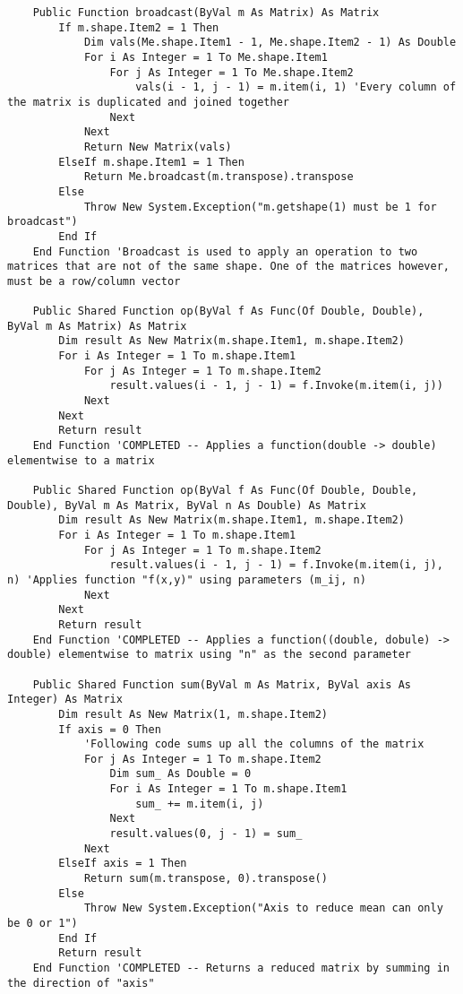\begin{verbatim}
    Public Function broadcast(ByVal m As Matrix) As Matrix
        If m.shape.Item2 = 1 Then
            Dim vals(Me.shape.Item1 - 1, Me.shape.Item2 - 1) As Double
            For i As Integer = 1 To Me.shape.Item1
                For j As Integer = 1 To Me.shape.Item2
                    vals(i - 1, j - 1) = m.item(i, 1) 'Every column of the matrix is duplicated and joined together
                Next
            Next
            Return New Matrix(vals)
        ElseIf m.shape.Item1 = 1 Then
            Return Me.broadcast(m.transpose).transpose
        Else
            Throw New System.Exception("m.getshape(1) must be 1 for broadcast")
        End If
    End Function 'Broadcast is used to apply an operation to two matrices that are not of the same shape. One of the matrices however, must be a row/column vector

    Public Shared Function op(ByVal f As Func(Of Double, Double), ByVal m As Matrix) As Matrix
        Dim result As New Matrix(m.shape.Item1, m.shape.Item2)
        For i As Integer = 1 To m.shape.Item1
            For j As Integer = 1 To m.shape.Item2
                result.values(i - 1, j - 1) = f.Invoke(m.item(i, j))
            Next
        Next
        Return result
    End Function 'COMPLETED -- Applies a function(double -> double) elementwise to a matrix

    Public Shared Function op(ByVal f As Func(Of Double, Double, Double), ByVal m As Matrix, ByVal n As Double) As Matrix
        Dim result As New Matrix(m.shape.Item1, m.shape.Item2)
        For i As Integer = 1 To m.shape.Item1
            For j As Integer = 1 To m.shape.Item2
                result.values(i - 1, j - 1) = f.Invoke(m.item(i, j), n) 'Applies function "f(x,y)" using parameters (m_ij, n) 
            Next
        Next
        Return result
    End Function 'COMPLETED -- Applies a function((double, dobule) -> double) elementwise to matrix using "n" as the second parameter

    Public Shared Function sum(ByVal m As Matrix, ByVal axis As Integer) As Matrix
        Dim result As New Matrix(1, m.shape.Item2)
        If axis = 0 Then
            'Following code sums up all the columns of the matrix
            For j As Integer = 1 To m.shape.Item2
                Dim sum_ As Double = 0
                For i As Integer = 1 To m.shape.Item1
                    sum_ += m.item(i, j)
                Next
                result.values(0, j - 1) = sum_
            Next
        ElseIf axis = 1 Then
            Return sum(m.transpose, 0).transpose()
        Else
            Throw New System.Exception("Axis to reduce mean can only be 0 or 1")
        End If
        Return result
    End Function 'COMPLETED -- Returns a reduced matrix by summing in the direction of "axis"


\end{verbatim}
